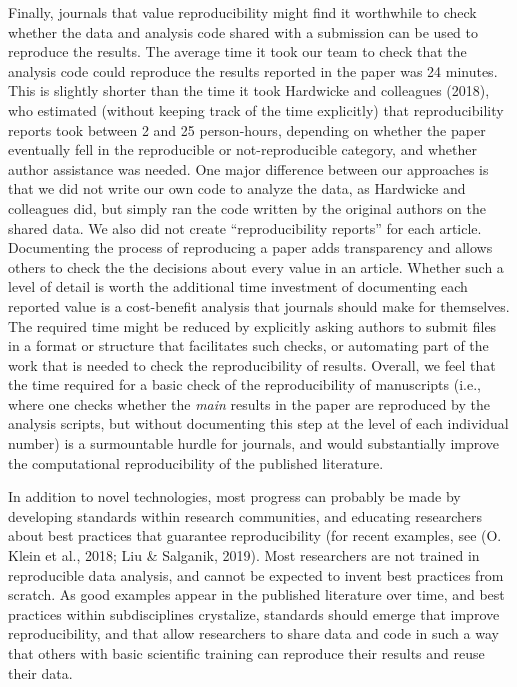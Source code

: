 \documentclass[
  ,jou, a4paper,floatsintext]{apa6}
\begin{document}
Finally, journals that value reproducibility might find it worthwhile to check whether the data and analysis code shared with a submission can be used to reproduce the results. The average time it took our team to check that the analysis code could reproduce the results reported in the paper was 24 minutes. This is slightly shorter than the time it took Hardwicke and colleagues (2018), who estimated (without keeping track of the time explicitly) that reproducibility reports took between 2 and 25 person-hours, depending on whether the paper eventually fell in the reproducible or not-reproducible category, and whether author assistance was needed. One major difference between our approaches is that we did not write our own code to analyze the data, as Hardwicke and colleagues did, but simply ran the code written by the original authors on the shared data. We also did not create \enquote{reproducibility reports} for each article. Documenting the process of reproducing a paper adds transparency and allows others to check the the decisions about every value in an article. Whether such a level of detail is worth the additional time investment of documenting each reported value is a cost-benefit analysis that journals should make for themselves. The required time might be reduced by explicitly asking authors to submit files in a format or structure that facilitates such checks, or automating part of the work that is needed to check the reproducibility of results. Overall, we feel that the time required for a basic check of the reproducibility of manuscripts (i.e., where one checks whether the \emph{main} results in the paper are reproduced by the analysis scripts, but without documenting this step at the level of each individual number) is a surmountable hurdle for journals, and would substantially improve the computational reproducibility of the published literature.

In addition to novel technologies, most progress can probably be made by developing standards within research communities, and educating researchers about best practices that guarantee reproducibility (for recent examples, see (O. Klein et al., 2018; Liu \& Salganik, 2019). Most researchers are not trained in reproducible data analysis, and cannot be expected to invent best practices from scratch. As good examples appear in the published literature over time, and best practices within subdisciplines crystalize, standards should emerge that improve reproducibility, and that allow researchers to share data and code in such a way that others with basic scientific training can reproduce their results and reuse their data.
\end{document}

